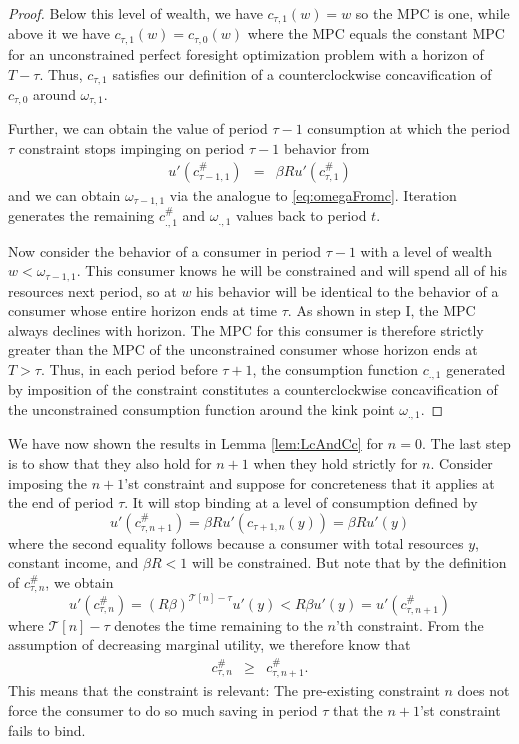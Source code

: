 \documentclass[titlepage]{\econtex}
\providecommand{\wAlt}{\omega}
\begin{document}
\begin{proof}
    Below this level of wealth, we have $c_{\tau,1}(w) = w$ so the MPC is one, while above it we have $c_{\tau,1}(w) = c_{\tau,0}(w)$ where the MPC equals the constant MPC for an unconstrained perfect foresight optimization problem with a horizon of $T-\tau$. Thus, $c_{\tau,1}$ satisfies our definition of a counterclockwise concavification of $c_{\tau,0}$ around $\wAlt_{\tau,1}$.  
    
    Further, we can obtain the value of period $\tau-1$ consumption at which the period $\tau$ constraint stops impinging on period $\tau-1$ behavior from
    \begin{eqnarray*}
      u'(c_{\tau-1,1}^{\#})   & = & \beta R u'(c_{\tau,1}^{\#}) \label{eq:ctaum1}
    \end{eqnarray*}
    and we can obtain $\wAlt_{\tau-1,1}$ via the analogue to \eqref{eq:omegaFromc}. Iteration generates the remaining $c_{.,1}^{\#}$ and $\wAlt_{.,1}$ values back to period $t$. 
    
    Now consider the behavior of a consumer in period $\tau-1$ with a level of wealth $w<\wAlt_{\tau-1,1}$.  This consumer knows he will be constrained and will spend all of his resources next period, so at $w$ his behavior will be identical to the behavior of a consumer whose entire horizon ends at time $\tau$.  As shown in step I, the MPC always declines with horizon. The MPC for this consumer is therefore strictly greater than the MPC of the unconstrained consumer whose horizon ends at $T > \tau$.  Thus, in each period before $\tau+1$, the consumption function $c_{.,1}$ generated by imposition of the constraint constitutes a counterclockwise concavification of the unconstrained consumption function around the kink point $\wAlt_{.,1}$. 
  \end{proof}
  
  We have now shown the results in Lemma \ref{lem:LcAndCc} for $n = 0$. The last step is to show that they also hold for $n+1$ when they hold strictly for $n$. Consider imposing the $n+1$'st constraint and suppose for concreteness that it applies at the end of period $\tau$. It will stop binding at a level of consumption defined by
  $$u'(c_{\tau,n+1}^{\#}) = \beta R u'(c_{\tau+1,n}({y})) = \beta Ru'(y)$$ 
  where the second equality follows because a consumer with total resources $y$, constant income, and $\beta R < 1$ will be constrained. But note that by the definition of $c^{\#}_{\tau,n}$, we obtain
  $$	u'(c_{\tau,n}^{\#})  =  (R \beta)^{\mathcal{T}[n]-\tau} u'({y})  <  R \beta u'({y}) = u'(c_{\tau,n+1}^{\#})$$
  where $\mathcal{T}[n]-\tau$ denotes the time remaining to the $n$'th constraint. From the assumption of decreasing marginal utility, we therefore know that
  \begin{eqnarray*}
    c_{\tau,n}^{\#} & \geq & c_{\tau,n+1}^{\#}.
  \end{eqnarray*}
  This means that the constraint is relevant: The pre-existing constraint $n$ does not force the consumer to do so much saving in period $\tau$ that the $n+1$'st constraint fails to bind.
  
\end{document}
